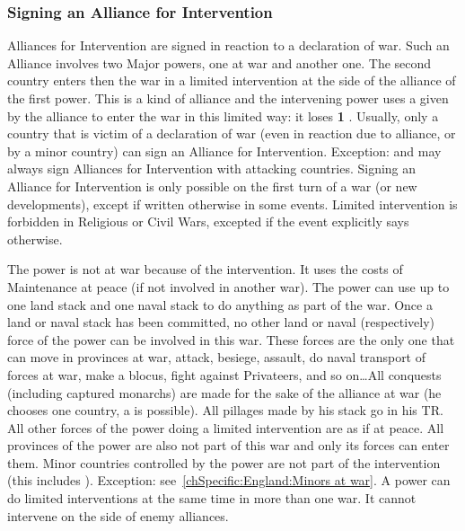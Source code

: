 \subsubsection{Signing an Alliance for Intervention}
\label{chDiplo:InterventionLimitee}
\aparag Alliances for Intervention are signed in reaction to a declaration of
war. Such an Alliance involves two Major powers, one at war and another
one. The second country enters then the war in a limited intervention at the
side of the alliance of the first power.
\bparag This is a kind of alliance and the intervening power uses a \CB given
by the alliance to enter the war in this limited way: it loses {\bf 1} \STAB.
\bparag Usually, only a country that is victim of a declaration of war (even
in reaction due to alliance, or by a minor country) can sign an Alliance for
Intervention.
\bparag Exception: \ENG and \PRU may always sign Alliances for Intervention
with attacking countries.
\bparag Signing an Alliance for Intervention is only possible on the first
turn of a war (or new developments), except if written otherwise in some
events.
\bparag Limited intervention is forbidden in Religious or Civil Wars, excepted
if the event explicitly says otherwise.

\bparag The power is not at war because of the intervention. It uses the costs
of Maintenance at peace (if not involved in another war).
\bparag The power can use up to one land stack and one naval stack to do
anything as part of the war. Once a land or naval stack has been committed, no
other land or naval (respectively) force of the power can be involved in this
war. These forces are the only one that can move in provinces at war, attack,
besiege, assault, do naval transport of forces at war, make a blocus, fight
against Privateers, and so on\ldots All conquests (including captured
monarchs) are made for the sake of the alliance at war (he chooses one
country, a \MAJ is possible). All pillages made by his stack go in his TR.
\bparag All other forces of the power doing a limited intervention are as if
at peace.  All provinces of the power are also not part of this war and only
its forces can enter them.
\bparag Minor countries controlled by the power are not part of the
intervention (this includes \VASSAL). Exception:
see~\ref{chSpecific:England:Minors at war}.
\bparag A power can do limited interventions at the same time in more than one
war. It cannot intervene on the side of enemy alliances.

